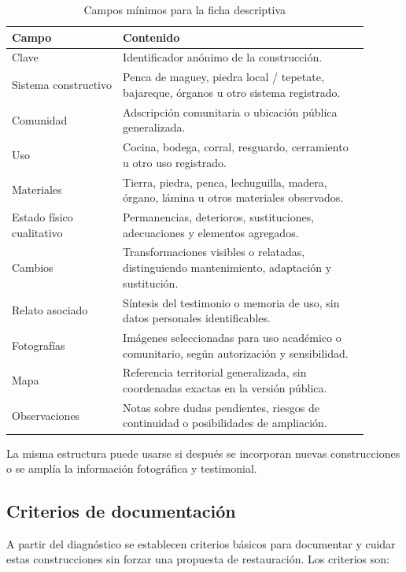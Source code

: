 \begin{table}[ht]
	\centering
	\caption{Campos mínimos para la ficha descriptiva}
	\vspace{0.25cm}
	\label{tab:campos_ficha_descriptiva}
	\begin{tabular}{@{}L{0.28\linewidth}L{0.62\linewidth}@{}}
		\toprule
		\textbf{Campo} & \textbf{Contenido} \\
		\midrule
		Clave & Identificador anónimo de la construcción. \\
		Sistema constructivo & Penca de maguey, piedra local / tepetate, bajareque, órganos u otro sistema registrado. \\
		Comunidad & Adscripción comunitaria o ubicación pública generalizada. \\
		Uso & Cocina, bodega, corral, resguardo, cerramiento u otro uso registrado. \\
		Materiales & Tierra, piedra, penca, lechuguilla, madera, órgano, lámina u otros materiales observados. \\
		Estado físico cualitativo & Permanencias, deterioros, sustituciones, adecuaciones y elementos agregados. \\
		Cambios & Transformaciones visibles o relatadas, distinguiendo mantenimiento, adaptación y sustitución. \\
		Relato asociado & Síntesis del testimonio o memoria de uso, sin datos personales identificables. \\
		Fotografías & Imágenes seleccionadas para uso académico o comunitario, según autorización y sensibilidad. \\
		Mapa & Referencia territorial generalizada, sin coordenadas exactas en la versión pública. \\
		Observaciones & Notas sobre dudas pendientes, riesgos de continuidad o posibilidades de ampliación. \\
		\bottomrule
	\end{tabular}
\end{table}

La misma estructura puede usarse si después se incorporan nuevas construcciones o se amplía la información fotográfica y testimonial.

\subsection{Criterios de documentación}

A partir del diagnóstico se establecen criterios básicos para documentar y cuidar estas construcciones sin forzar una propuesta de restauración. Los criterios son:

